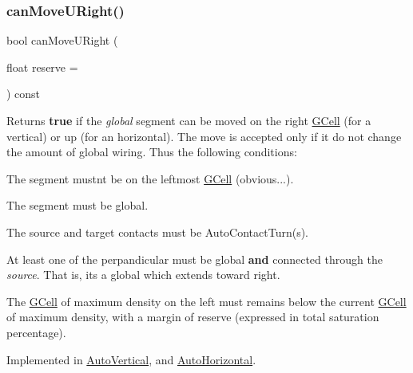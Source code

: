 \subsubsection{\texorpdfstring{can\+Move\+U\+Right()}{canMoveURight()}}
{\footnotesize\ttfamily bool can\+Move\+U\+Right (\begin{DoxyParamCaption}\item[{float}]{reserve = {} }\end{DoxyParamCaption}) const\hspace{0.3cm}{\ttfamily [pure virtual]}}

\begin{DoxyReturn}{Returns}
{\bfseries true} if the {\itshape global} segment can be moved on the right \mbox{\hyperlink{classKatabatic_1_1GCell}{G\+Cell}} (for a vertical) or up (for an horizontal). The move is accepted only if it do not change the amount of global wiring. Thus the following conditions\+:
\begin{DoxyItemize}
\item The segment mustn\textquotesingle{}t be on the leftmost \mbox{\hyperlink{classKatabatic_1_1GCell}{G\+Cell}} (obvious...).
\item The segment must be global.
\item The source and target contacts must be Auto\+Contact\+Turn(s).
\item At least one of the perpandicular must be global {\bfseries and} connected through the {\itshape source}. That is, it\textquotesingle{}s a global which extends toward right.
\item The \mbox{\hyperlink{classKatabatic_1_1GCell}{G\+Cell}} of maximum density on the left must remains below the current \mbox{\hyperlink{classKatabatic_1_1GCell}{G\+Cell}} of maximum density, with a margin of {\ttfamily reserve} (expressed in total saturation percentage). 
\end{DoxyItemize}
\end{DoxyReturn}


Implemented in \mbox{\hyperlink{classKatabatic_1_1AutoVertical_ad0c972e34d6bac47bd9276a7d6e053d8}{Auto\+Vertical}}, and \mbox{\hyperlink{classKatabatic_1_1AutoHorizontal_ad0c972e34d6bac47bd9276a7d6e053d8}{Auto\+Horizontal}}.

\mbox{\label{classKatabatic_1_1AutoSegment_a6482341a342eb6e6b3b43f13fd4436f6}} 
